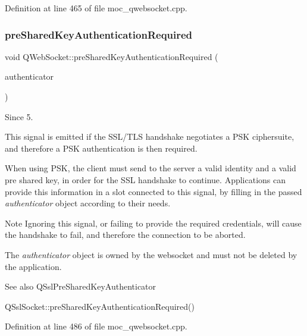 Definition at line 465 of file moc\+\_\+qwebsocket.\+cpp.

\mbox{\label{class_q_web_socket_ab12bc04c9c86d4b76238d8f3a25dcfa1}} 
\subsubsection{\texorpdfstring{pre\+Shared\+Key\+Authentication\+Required}{preSharedKeyAuthenticationRequired}}
{\footnotesize\ttfamily void Q\+Web\+Socket\+::pre\+Shared\+Key\+Authentication\+Required (\begin{DoxyParamCaption}\item[{Q\+Ssl\+Pre\+Shared\+Key\+Authenticator $\ast$}]{authenticator }\end{DoxyParamCaption})\hspace{0.3cm}{\ttfamily [signal]}}

\begin{DoxySince}{Since}
5.
\end{DoxySince}
This signal is emitted if the S\+S\+L/\+T\+LS handshake negotiates a P\+SK ciphersuite, and therefore a P\+SK authentication is then required.

When using P\+SK, the client must send to the server a valid identity and a valid pre shared key, in order for the S\+SL handshake to continue. Applications can provide this information in a slot connected to this signal, by filling in the passed {\itshape authenticator} object according to their needs.

\begin{DoxyNote}{Note}
Ignoring this signal, or failing to provide the required credentials, will cause the handshake to fail, and therefore the connection to be aborted.

The {\itshape authenticator} object is owned by the websocket and must not be deleted by the application.
\end{DoxyNote}
\begin{DoxySeeAlso}{See also}
Q\+Ssl\+Pre\+Shared\+Key\+Authenticator 

Q\+Ssl\+Socket\+::pre\+Shared\+Key\+Authentication\+Required() 
\end{DoxySeeAlso}


Definition at line 486 of file moc\+\_\+qwebsocket.\+cpp.

